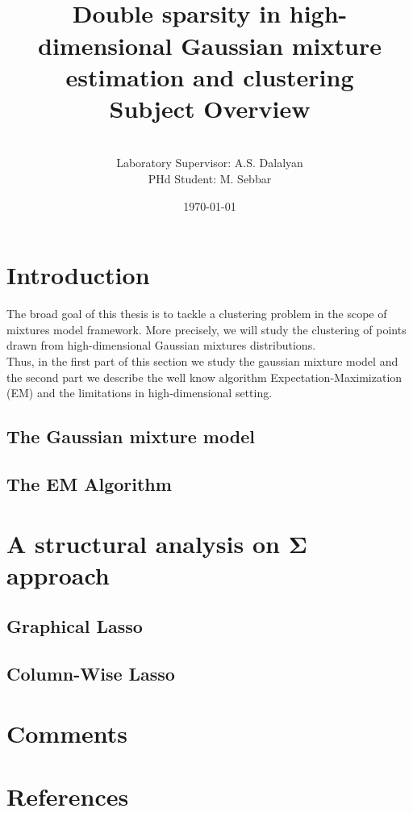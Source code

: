\documentclass[12pt]{article}
\title{\vspace{-60pt}~\\Double sparsity in high-dimensional Gaussian mixture estimation and clustering\\Subject Overview}
\author{\vspace{-20pt}~\\ Laboratory Supervisor: A.S. Dalalyan\\
PHd Student: M. Sebbar}
\date{\today}
\def\bSigma{\boldsymbol\Sigma}
\begin{document}
\maketitle
\tableofcontents
\newpage
\section{Introduction}
The broad goal of this thesis is to tackle a clustering problem in the scope of mixtures model framework. More precisely, we will study the clustering of points drawn from high-dimensional Gaussian mixtures distributions.\\Thus, in the first part of this section we study the gaussian mixture model and the second part we describe the well know algorithm Expectation-Maximization (EM) and the limitations in high-dimensional setting.
\subsection{The Gaussian mixture model}


\subsection{The EM Algorithm}
\section{A structural analysis on $\bSigma$ approach}
\subsection{Graphical Lasso}
\subsection{Column-Wise Lasso}
\section{Comments}
\section{References}
\end{document}

